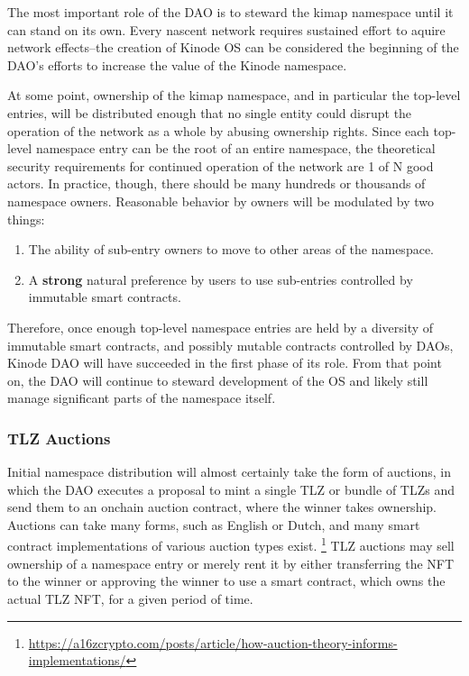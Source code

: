 \documentclass[runningheads]{llncs}
\begin{document}
The most important role of the DAO is to steward the kimap namespace until it can stand on its own.
Every nascent network requires sustained effort to aquire network effects–the creation of Kinode OS can be considered the beginning of the DAO's efforts to increase the value of the Kinode namespace.

At some point, ownership of the kimap namespace, and in particular the top-level entries, will be distributed enough that no single entity could disrupt the operation of the network as a whole by abusing ownership rights.
Since each top-level namespace entry can be the root of an entire namespace, the theoretical security requirements for continued operation of the network are 1 of N good actors.
In practice, though, there should be many hundreds or thousands of namespace owners.
Reasonable behavior by owners will be modulated by two things:
\begin{enumerate}
    \item The ability of sub-entry owners to move to other areas of the namespace.
    \item A \textbf{strong} natural preference by users to use sub-entries controlled by immutable smart contracts.
\end{enumerate}

Therefore, once enough top-level namespace entries are held by a diversity of immutable smart contracts, and possibly mutable contracts controlled by DAOs, Kinode DAO will have succeeded in the first phase of its role.
From that point on, the DAO will continue to steward development of the OS and likely still manage significant parts of the namespace itself.

\subsubsection{TLZ Auctions}
\label{sec:daotldauctions}

Initial namespace distribution will almost certainly take the form of auctions, in which the DAO executes a proposal to mint a single TLZ or bundle of TLZs and send them to an onchain auction contract, where the winner takes ownership.
Auctions can take many forms, such as English or Dutch, and many smart contract implementations of various auction types exist.
\footnote{\url{https://a16zcrypto.com/posts/article/how-auction-theory-informs-implementations/}}
TLZ auctions may sell ownership of a namespace entry or merely rent it by either transferring the NFT to the winner or approving the winner to use a smart contract, which owns the actual TLZ NFT, for a given period of time.
\end{document}
